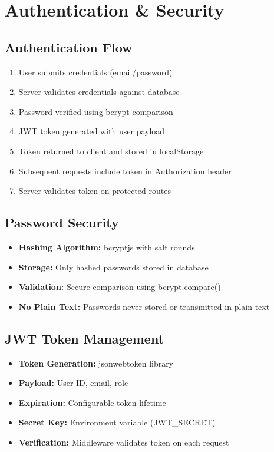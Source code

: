 \documentclass[12pt,a4paper]{article}
\begin{document}
\newpage

\section{Authentication \& Security}


\subsection{Authentication Flow}

\begin{enumerate}[leftmargin=*]
    \item User submits credentials (email/password)
    \item Server validates credentials against database
    \item Password verified using bcrypt comparison
    \item JWT token generated with user payload
    \item Token returned to client and stored in localStorage
    \item Subsequent requests include token in Authorization header
    \item Server validates token on protected routes
\end{enumerate}

\subsection{Password Security}

\begin{itemize}[leftmargin=*]
    \item \textbf{Hashing Algorithm:} bcryptjs with salt rounds
    \item \textbf{Storage:} Only hashed passwords stored in database
    \item \textbf{Validation:} Secure comparison using bcrypt.compare()
    \item \textbf{No Plain Text:} Passwords never stored or transmitted in plain text
\end{itemize}

\subsection{JWT Token Management}

\begin{itemize}[leftmargin=*]
    \item \textbf{Token Generation:} jsonwebtoken library
    \item \textbf{Payload:} User ID, email, role
    \item \textbf{Expiration:} Configurable token lifetime
    \item \textbf{Secret Key:} Environment variable (JWT\_SECRET)
    \item \textbf{Verification:} Middleware validates token on each request
\end{itemize}
\end{document}
